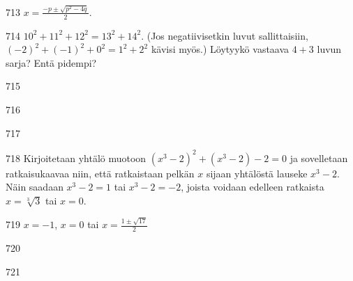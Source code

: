 \begin{Vastaus}{713}
		$x=\frac{-p \pm \sqrt{p^2-4q}}{2}$.
	
\end{Vastaus}
\begin{Vastaus}{714}
		$10^2+11^2+12^2 = 13^2 + 14^2$.
    	(Jos negatiivisetkin luvut sallittaisiin, $(-2)^2+(-1)^2+0^2 = 1^2 + 2^2$ kävisi myös.) Löytyykö vastaava $4 + 3$ luvun sarja? Entä pidempi?
    
\end{Vastaus}
\begin{Vastaus}{715}
    
\end{Vastaus}
\begin{Vastaus}{716}
    
\end{Vastaus}
\begin{Vastaus}{717}
    
\end{Vastaus}
\begin{Vastaus}{718}
		Kirjoitetaan yhtälö muotoon $(x^3-2)^2+(x^3-2)-2=0$ ja sovelletaan ratkaisukaavaa niin, että ratkaistaan pelkän $x$ sijaan yhtälöstä lauseke $x^3-2$. Näin saadaan $x^3-2=1$ tai $x^3-2=-2$, joista voidaan edelleen ratkaista $x=\sqrt[3]{3}$ tai $x=0$.
	
\end{Vastaus}
\begin{Vastaus}{719}
		$x=-1$, $x=0$ tai $x=\frac{1 \pm \sqrt{17}}{2}$
	
\end{Vastaus}
\begin{Vastaus}{720}
	
\end{Vastaus}
\begin{Vastaus}{721}
	
\end{Vastaus}
